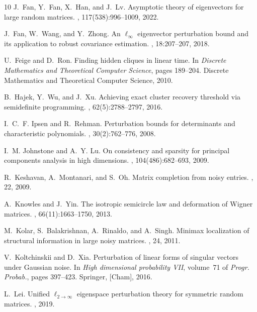 \documentclass[reqno]{amsart}
\theoremstyle{plain}
\theoremstyle{definition}
\begin{document}
\begin{thebibliography}{10}
J.~Fan, Y.~Fan, X.~Han, and J.~Lv.
\newblock Asymptotic theory of eigenvectors for large random matrices.
,
  117(538):996--1009, 2022.

J.~Fan, W.~Wang, and Y.~Zhong.
\newblock An {$\ell_\infty$} eigenvector perturbation bound and its application
  to robust covariance estimation.
, 18:207--207, 2018.

U.~Feige and D.~Ron.
\newblock Finding hidden cliques in linear time.
\newblock In {\em Discrete Mathematics and Theoretical Computer Science}, pages
  189--204. Discrete Mathematics and Theoretical Computer Science, 2010.

B.~Hajek, Y.~Wu, and J.~Xu.
\newblock Achieving exact cluster recovery threshold via semidefinite
  programming.
, 62(5):2788--2797,
  2016.

I.~C.~F. Ipsen and R.~Rehman.
\newblock Perturbation bounds for determinants and characteristic polynomials.
, 30(2):762--776, 2008.

I.~M. Johnstone and A.~Y. Lu.
\newblock On consistency and sparsity for principal components analysis in high
  dimensions.
,
  104(486):682--693, 2009.

R.~Keshavan, A.~Montanari, and S.~Oh.
\newblock Matrix completion from noisy entries.
, 22, 2009.

A.~Knowles and J.~Yin.
\newblock The isotropic semicircle law and deformation of {W}igner matrices.
, 66(11):1663--1750, 2013.

M.~Kolar, S.~Balakrishnan, A.~Rinaldo, and A.~Singh.
\newblock Minimax localization of structural information in large noisy
  matrices.
, 24, 2011.

V.~Koltchinskii and D.~Xia.
\newblock Perturbation of linear forms of singular vectors under {G}aussian
  noise.
\newblock In {\em High dimensional probability {VII}}, volume~71 of {\em Progr.
  Probab.}, pages 397--423. Springer, [Cham], 2016.

L.~Lei.
\newblock Unified $\ell_{2\to\infty}$ eigenspace perturbation theory for
  symmetric random matrices.
, 2019.


\end{thebibliography}
\end{document}
